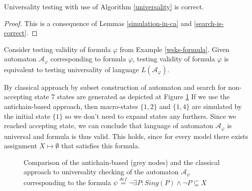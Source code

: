 \begin{lemma}
Universality testing with use of Algorithm \ref{universality} is correct.
\end{lemma}
\begin{proof}
This is a consequence of Lemmas \ref{simulation-in-ca} and \ref{search-is-correct}.
\end{proof}

\noindent\hrulefill
\begin{example}
Consider testing validity of formula $\varphi$ from Example \ref{wsks-formula}.
Given automaton $\mathcal{A}_\varphi$ corresponding to formula $\varphi$,
testing validity of formula $\varphi$ is equivalent to testing universality of
language $L(\mathcal{A}_\varphi)$.

By classical approach by subset construction of automaton and search for
non-accepting state 7 states are generated as depicted at Figure
\ref{compare} If we use the antichain-based approach, then macro-states $\{1,
2\}$ and $\{1, 4\}$ are simulated by the initial state $\{1\}$ so we don't need
to expand states any furthers. Since we reached accepting state, we can conclude
that language of automaton $\mathcal{A}_\varphi$ is universal and formula is
thus valid. This holds, since for every model there exists assignment $X
\mapsto \emptyset$ that satisfies this formula.
\end{example}

\noindent\hrulefill

\begin{figure}
 \begin{center}
 \end{center}
 \caption{Comparison of the antichain-based (grey nodes) and the classical
 approach to universality checking of the automaton $\mathcal{A}_\psi$
 corresponding to the formula $\psi \overset{\mathit{def}}{=} \neg\exists P:
 Sing(P) \wedge\neg P \subseteq X$}\label{compare}
\end{figure}

